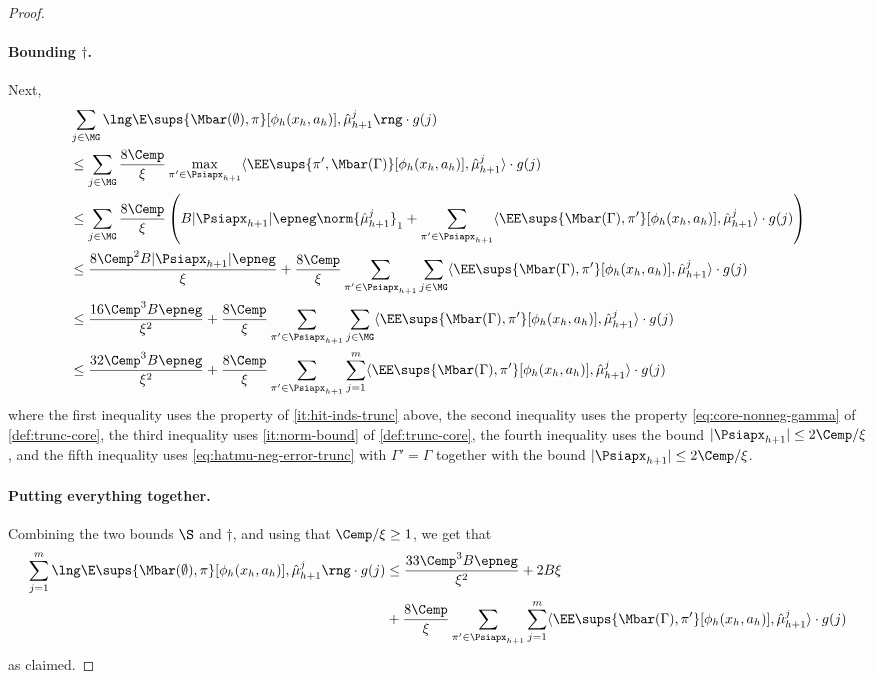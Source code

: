 \documentclass[11pt, oneside]{article}
\theoremstyle{plain}
\theoremstyle{definition}
\numberwithin{theorem}{section}
\renewcommand{\^}[1]{^{(#1)}}
\begin{document}
\begin{proof}
\paragraph{Bounding $\dag$.} Next,
\begin{align*}
& \sum_{j\in \MG} \lng \E\sups{\Mbar(\emptyset), \pi}[\phi_h(x_h, a_h)], \hat \mu_{h+1}^j \rng \cdot g(j)\\
&\leq \sum_{j \in \MG} \frac{8\Cemp}{\xi}\max_{\pi' \in \Psiapx_{h+1}} \langle \EE\sups{\pi', \Mbar(\Gamma)}[\phi_h(x_h,a_h)],\hat\mu_{h+1}^j\rangle \cdot g(j) \\
&\leq \sum_{j \in \MG} \frac{8\Cemp}{\xi} \left(B|\Psiapx_{h+1}|\epneg\norm{\hat\mu_{h+1}^j}_1 + \sum_{\pi' \in \Psiapx_{h+1}}\langle \EE\sups{\Mbar(\Gamma),\pi'}[\phi_h(x_h,a_h)],\hat\mu_{h+1}^j\rangle \cdot g(j)\right) \\
&\leq \frac{8\Cemp^2 B|\Psiapx_{h+1}|\epneg}{\xi} + \frac{8\Cemp}{\xi} \sum_{\pi' \in \Psiapx_{h+1}} \sum_{j \in \MG} \langle \EE\sups{\Mbar(\Gamma),\pi'}[\phi_h(x_h,a_h)],\hat\mu_{h+1}^j\rangle \cdot g(j) \\
&\leq \frac{16\Cemp^3 B\epneg}{\xi^2} + \frac{8\Cemp}{\xi} \sum_{\pi' \in \Psiapx_{h+1}} \sum_{j \in \MG} \langle \EE\sups{\Mbar(\Gamma),\pi'}[\phi_h(x_h,a_h)],\hat\mu_{h+1}^j\rangle \cdot g(j) \\
&\leq \frac{32\Cemp^3 B\epneg}{\xi^2} + \frac{8\Cemp}{\xi} \sum_{\pi' \in \Psiapx_{h+1}} \sum_{j =1}^m \langle \EE\sups{\Mbar(\Gamma), \pi'}[\phi_h(x_h,a_h)],\hat\mu_{h+1}^j\rangle \cdot g(j)
\end{align*}
where the first inequality uses the property of \cref{it:hit-inds-trunc} above, the second inequality uses the property \cref{eq:core-nonneg-gamma} of \cref{def:trunc-core}, the third inequality uses \cref{it:norm-bound} of \cref{def:trunc-core}, the fourth inequality uses the bound $|\Psiapx_{h+1}| \leq 2\Cemp/\xi$, and the fifth inequality uses \cref{eq:hatmu-neg-error-trunc} with $\Gamma' = \Gamma$ together with the bound $|\Psiapx_{h+1}| \leq 2\Cemp/\xi$.

\paragraph{Putting everything together.} Combining the two bounds $\S$ and $\dag$, and using that $\Cemp/\xi \geq 1$, we get that
\begin{align*} 
\sum_{j=1}^m \lng \E\sups{\Mbar(\emptyset),\pi}[\phi_h(x_h, a_h)], \hat \mu_{h+1}^j \rng \cdot g(j)
&\leq \frac{33\Cemp^3 B\epneg}{\xi^2} + 2B\xi \\
&+ \frac{8\Cemp}{\xi} \sum_{\pi' \in \Psiapx_{h+1}} \sum_{j =1}^m \langle \EE\sups{\Mbar(\Gamma),\pi'}[\phi_h(x_h,a_h)],\hat\mu_{h+1}^j\rangle \cdot g(j)
\end{align*}
as claimed. 
\end{proof}
\end{document}
